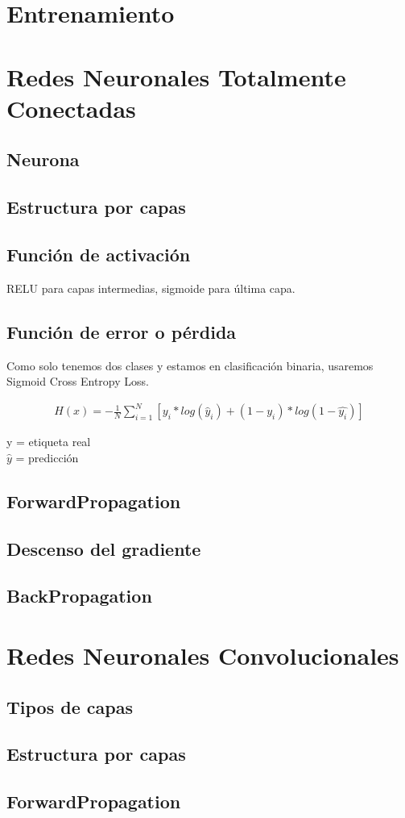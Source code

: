 \section{Entrenamiento}

\section{Redes Neuronales Totalmente Conectadas}

\subsection{Neurona}
\subsection{Estructura por capas}
\subsection{Función de activación}

RELU para capas intermedias, sigmoide para última capa.

\subsection{Función de error o pérdida}

Como solo tenemos dos clases y estamos en clasificación binaria, usaremos Sigmoid Cross Entropy Loss.

\begin{gather}
   H(x) = - \frac{1}{N} \sum_{i=1}^{N}  [y_i * log( \hat{y}_i) + (1-y_i)*log(1-\hat{y_i})]
\end{gather}

y = etiqueta real \\
$\hat{y}$ = predicción 

\subsection{ForwardPropagation}
\subsection{Descenso del gradiente}
\subsection{BackPropagation}

\section{Redes Neuronales Convolucionales}

\subsection{Tipos de capas}

\subsection{Estructura por capas}

\subsection{ForwardPropagation}
